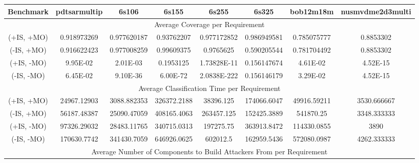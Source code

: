 
\newpage
\begin{landscape}
	\begin{table}[!t]
		\centering		
		\centering
		\begin{tabular}{|c|c|c|c|c|c|c|c|}
			\hline
			Benchmark  & pdtsarmultip & 6s106       & 6s155       & 6s255       & 6s325       & bob12m18m   & nusmvdme2d3multi \\ \hline
			\multicolumn{8}{|c|}{Average Coverage per Requirement}                                                             \\ \hline
			(+IS, +MO) & 0.918973269  & 0.977620187 & 0.93762207  & 0.977172852 & 0.986949581 & 0.785075777 & 0.8853302        \\
			(-IS, +MO) & 0.916622423  & 0.977008259 & 0.99609375  & 0.9765625   & 0.590205544 & 0.781704492 & 0.8853302        \\
			(+IS, -MO) & 9.95E-02     & 2.01E-03    & 0.1953125   & 1.73828E-11 & 0.156147674 & 4.61E-02    & 4.52E-15         \\
			(-IS, -MO) & 6.45E-02     & 9.10E-36    & 6.00E-72    & 2.0838E-222 & 0.156146179 & 3.29E-02    & 4.52E-15         \\ \hline
			\multicolumn{8}{|c|}{Average Classification Time per Requirement}                                                  \\ \hline
			(+IS, +MO) & 24967.12903  & 3088.882353 & 326372.2188 & 38396.125   & 174066.6047 & 49916.59211 & 3530.666667      \\
			(-IS, +MO) & 56187.48387  & 25090.47059 & 408165.4063 & 263457.125  & 152425.3889 & 541870.25   & 3348.333333      \\
			(+IS, -MO) & 97326.29032  & 28483.11765 & 340715.0313 & 197275.75   & 363913.8472 & 114330.0855 & 3890             \\
			(-IS, -MO) & 170630.7742  & 341430.7059 & 646926.0625 & 602012.5    & 162959.5436 & 572080.0987 & 4262.333333      \\ \hline
			\multicolumn{8}{|c|}{Average Number of Components to Build Attackers From per Requirement}                         \\ 

\end{tabular}
\end{table}
\end{landscape}
